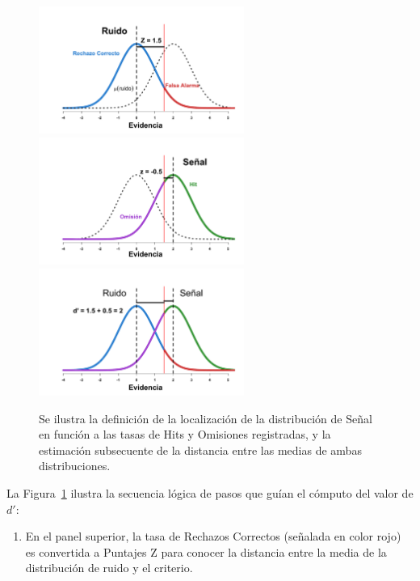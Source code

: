 \begin{itemize}
\begin{figure}[th]
\centering
\includegraphics[width=0.60\textwidth]{Figures/dR_1}\\ 
\includegraphics[width=0.60\textwidth]{Figures/dR_2}\\
\includegraphics[width=0.60\textwidth]{Figures/dR_3}\\ 
\caption[Estimación de la discriminabilidad con base en las Tasas de Ejecución]{Se ilustra la definición de la localización de la distribución de Señal en función a las tasas de Hits y Omisiones registradas, y la estimación subsecuente de la distancia entre las medias de ambas distribuciones.}
\label{fig:Graf_Discrim}
\end{figure}

La Figura~\ref{fig:Graf_Discrim} ilustra la secuencia lógica de pasos que guían el cómputo del valor de $d'$:\\

\begin{enumerate}
\item En el panel superior, la tasa de Rechazos Correctos (señalada en color rojo) es convertida a Puntajes Z para conocer la distancia entre la media de la distribución de ruido y el criterio.\\


\end{enumerate}
\end{itemize}
